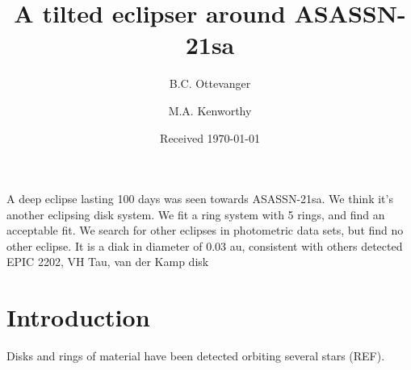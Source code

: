 \documentclass[]{aa} %
\begin{document}
   \title{A tilted eclipser around ASASSN-21sa}

   \author{B.C. Ottevanger \and 
   M.A. Kenworthy
          }
             
   \date{Received \today}

 
  \abstract
  {}  
   {A deep eclipse lasting 100 days was seen towards ASASSN-21sa. We think it's another eclipsing disk system.}
   {We fit a ring system with 5 rings, and find an acceptable fit. We search for other eclipses in photometric data sets, but find no other eclipse.}
   {It is a diak in diameter of 0.03 au, consistent with others detected EPIC 2202, VH Tau, van der Kamp disk
   }
   {}


   \maketitle
%

\section{Introduction}\label{sec:intro}

Disks and rings of material have been detected orbiting several stars (REF).

\end{document}
